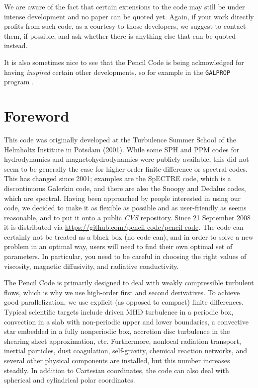 \documentclass[\mydriver,12pt,twoside,notitlepage,a4paper]{article}
\makeatletter
\newcommand{\name}[2][]{%
  \def\index@{#1}%
  \textsl{#2\/}%
  \ifx\index@\@empty\index{#2@\MakeUppercase #2}%
  \else\index{#1}%
  \fi%
}
\makeatother
\begin{document}
We are aware of the fact that certain extensions to the code may
still be under intense development and no paper can be quoted yet.
Again, if your work directly profits from such code,
as a courtesy to those developers, we suggest to contact them,
if possible, and ask whether there is anything else that can be quoted
instead.

It is also sometimes nice to see that the {\sc Pencil Code} is being
acknowledged for having {\em inspired} certain other developments,
so for example in the {\tt GALPROP} program \cite{Porter+22}.

\clearpage


\section*{Foreword}

This code was originally developed at the Turbulence Summer School of the
Helmholtz Institute in Potsdam (2001).
While some SPH and PPM codes for hydrodynamics and magnetohydrodynamics
were publicly available, this did not seem to be generally
the case for higher order finite-difference or spectral codes.
This has changed since 2001; examples are the SpECTRE code,
which is a discontinuous Galerkin code, and there are also the
Snoopy and Dedalus codes, which are spectral.
Having been approached by people interested in using our code, we
decided to make it as flexible as possible and as user-friendly as seems
reasonable, and to put it onto a public \name{CVS} repository.
Since 21 September 2008 it is distributed via
\url{https://github.com/pencil-code/pencil-code}.
The code can certainly not be treated as a black box (no code can), and in
order to solve a new problem in an optimal way, users will need to find their
own optimal set of parameters.
In particular, you need to be careful in choosing
the right values of viscosity, magnetic diffusivity, and radiative
conductivity.

The {\sc Pencil Code} is primarily designed to deal with weakly compressible
turbulent flows, which is why we use high-order first and second derivatives.
To achieve good parallelization, we use explicit
(as opposed to compact) finite differences.
Typical scientific targets include driven MHD turbulence in a periodic box,
convection in a slab with non-periodic upper and lower boundaries,
a convective star embedded in a fully nonperiodic box, accretion disc
turbulence in the shearing sheet approximation, etc.
Furthermore, nonlocal radiation transport, inertial particles,
dust coagulation, self-gravity, chemical reaction networks, and several
other physical components are installed, but this number increases steadily.
In addition to Cartesian coordinates, the code can also deal with spherical
and cylindrical polar coordinates.
\end{document}
